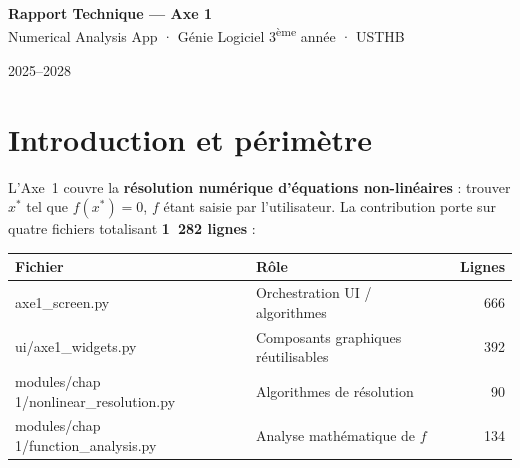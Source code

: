 \documentclass[11pt,a4paper]{article}
\begin{document}
\thispagestyle{fancy}

\begin{tcolorbox}[colback=primary, colframe=primary, arc=5pt, left=10pt, right=10pt,
                  top=6pt, bottom=6pt]
  \begin{minipage}{0.68\textwidth}
    {\large\bfseries\color{white} Rapport Technique — Axe 1}\\[2pt]
    {\small\color{white!80!black} Numerical Analysis App · Génie Logiciel 3\textsuperscript{ème} année · USTHB}
  \end{minipage}
  \hfill
  \begin{minipage}{0.28\textwidth}\raggedleft
    
    {\scriptsize\color{white!70!black} 2025--2028}
  \end{minipage}
\end{tcolorbox}

\vspace{4pt}

\section{Introduction et périmètre}

L'Axe~1 couvre la \textbf{résolution numérique d'équations non-linéaires} : trouver
$x^*$ tel que $f(x^*)=0$, $f$ étant saisie par l'utilisateur. La contribution porte sur
quatre fichiers totalisant \textbf{1~282 lignes} :

\vspace{3pt}
\renewcommand{\arraystretch}{1.2}
\begin{tabularx}{\linewidth}{>{\ttfamily\scriptsize}l X r}
\toprule
\normalfont\small\textbf{Fichier} & \small\textbf{Rôle} & \small\textbf{Lignes} \\
\midrule
axe1\_screen.py & Orchestration UI / algorithmes & 666 \\
ui/axe1\_widgets.py & Composants graphiques réutilisables & 392 \\
modules/chap\,1/nonlinear\_resolution.py & Algorithmes de résolution & 90 \\
modules/chap\,1/function\_analysis.py & Analyse mathématique de $f$ & 134 \\
\bottomrule
\end{tabularx}

\end{document}
